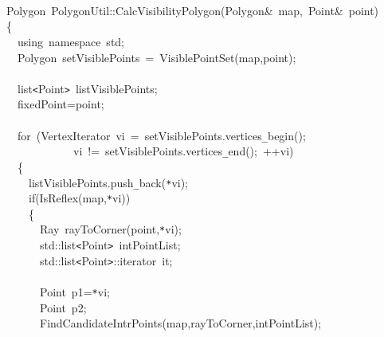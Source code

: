 \documentclass[a4paper,10pt]{article}
\begin{document}
{
\noindent \ttfamily
\jttstylea \\
\jttstylea \\
\jttstylea \\
\jttstylek Polygon~PolygonUtil::CalcVisibilityPolygon\jttstylei (\jttstylek Polygon\&~map,~Point\&~point\jttstylei )\\
\jttstylei \{\\
\jttstylea ~~\jttstylek using~namespace~std;\\
\jttstylea ~~\jttstylek Polygon~setVisiblePoints~=~VisiblePointSet\jttstylei (\jttstylek map,point\jttstylei )\jttstylek ;\\
\jttstylea \\
\jttstylea ~~\jttstylek list\verb#<#Point\verb#>#~listVisiblePoints;\\
\jttstylea ~~\jttstylek fixedPoint=point;\\
\jttstylea \\
\jttstylea ~~\jttstylee for~\jttstylei (\jttstylek VertexIterator~vi~=~setVisiblePoints.vertices\verb#_#begin\jttstylei ()\jttstylek ;\\
\jttstylea ~~~~~~~~~~~~\jttstylek vi~!=~setVisiblePoints.vertices\verb#_#end\jttstylei ()\jttstylek ;~++vi\jttstylei )\\
\jttstylea ~~\jttstylei \{\\
\jttstylea ~~~~\jttstylek listVisiblePoints.push\verb#_#back\jttstylei (\jttstylek \verb#*#vi\jttstylei )\jttstylek ;\\
\jttstylea ~~~~\jttstylee if\jttstylei (\jttstylek IsReflex\jttstylei (\jttstylek map,\verb#*#vi\jttstylei ))\\
\jttstylea ~~~~\jttstylei \{\\
\jttstylea ~~~~~~\jttstylek Ray~rayToCorner\jttstylei (\jttstylek point,\verb#*#vi\jttstylei )\jttstylek ;\\
\jttstylea ~~~~~~\jttstylek std::list\verb#<#Point\verb#>#~intPointList;\\
\jttstylea ~~~~~~\jttstylek std::list\verb#<#Point\verb#>#::iterator~it;\\
\jttstylea \\
\jttstylea ~~~~~~\jttstylek Point~p1=\verb#*#vi;\\
\jttstylea ~~~~~~\jttstylek Point~p2;\\
\jttstylea ~~~~~~\jttstylek FindCandidateIntrPoints\jttstylei (\jttstylek map,rayToCorner,intPointList\jttstylei )\jttstylek ;\\
}
\end{document}
